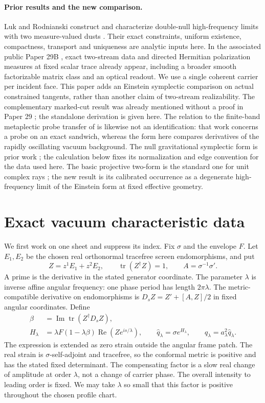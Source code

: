 \documentclass[11pt]{article}
\newcommand{\tr}{\operatorname{tr}}
\newcommand{\re}{\operatorname{Re}}
\newcommand{\im}{\operatorname{Im}}
\begin{document}
\paragraph{Prior results and the new comparison.}
Luk and Rodnianski construct and characterize
double-null high-frequency limits with two
measure-valued dusts \cite{LR}. Their exact constraints,
uniform existence, compactness, transport and uniqueness
are analytic inputs here. In the associated public Paper
29B \cite{paper29B}, exact two-stream data and directed
Hermitian polarization measures at fixed scalar trace
already appear, including a broader smooth factorizable
matrix class and an optical readout. We use a single
coherent carrier per incident face. This paper adds an
Einstein symplectic comparison on actual constrained
tangents, rather than another claim of two-stream
realizability. The complementary marked-cut result
was already mentioned without a proof in Paper 29
\cite{paper29}; the standalone derivation is given here. The relation to the finite-band
metaplectic probe transfer of \cite{transfer} is likewise
not an identification: that work concerns a probe on an
exact sandwich, whereas the form here compares
derivatives of the rapidly oscillating vacuum background.
The null gravitational symplectic form is prior work
\cite{Reisenberger,HF}; the calculation below fixes its
normalization and edge convention for the data used here.
The basic projective two-form is the standard one for
unit complex rays \cite{AS}; the new result is its
calibrated occurrence as a degenerate high-frequency
limit of the Einstein form at fixed effective geometry.

\section{Exact vacuum characteristic data}\label{sec:data}

We first work on one sheet and suppress its index.
Fix \(\sigma\) and the envelope \(F\).
Let \(E_1,E_2\) be the chosen real orthonormal tracefree
screen endomorphisms, and put
\[
 Z=z^1 E_1+z^2 E_2,\qquad \tr(Z^\dagger Z)=1,\qquad
 A=\sigma^{-1}\sigma'.
\]
A prime is the derivative in the stated generator
coordinate. The parameter \(\lambda\) is inverse affine
angular frequency: one phase period has length \(2\pi\lambda\). The metric-compatible derivative on
endomorphisms is \(D_s Z=Z'+[A,Z]/2\) in fixed
angular coordinates. Define
\begin{align}
 \beta&=\im\tr(Z^\dagger D_s Z),\nonumber\\
 H_\lambda&=\lambda F(1-\lambda\beta)
                    \re(Z e^{is/\lambda}),\qquad
 \widehat q_\lambda=\sigma e^{H_\lambda},\qquad
 q_\lambda=a_\lambda^2\widehat q_\lambda .
 \label{eq:ansatz}
\end{align}
The expression is extended as zero strain outside the
angular frame patch. The real strain is
\(\sigma\)-self-adjoint and tracefree, so the conformal
metric is positive and has the stated fixed determinant.
The compensating factor is a slow real change of
amplitude at order \(\lambda\), not a change of carrier
phase. The overall intensity to leading order is fixed.
We may take \(\lambda\) so small that this factor is
positive throughout the chosen profile chart.
\end{document}
